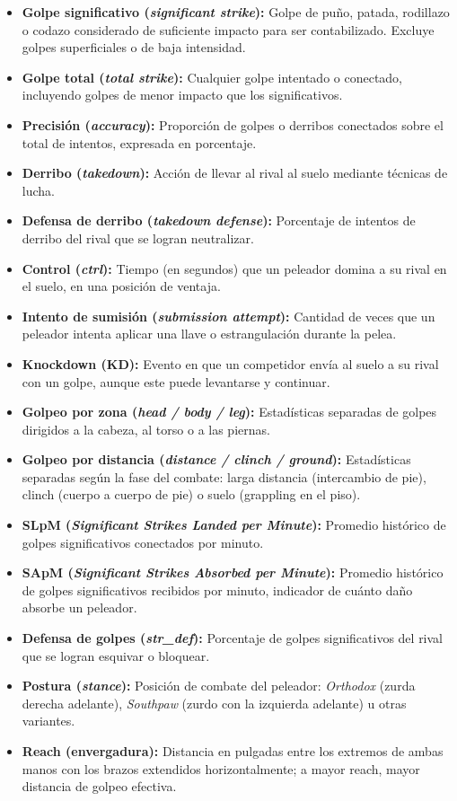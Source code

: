 \documentclass[11pt,a4paper]{article}
\begin{document}
\begin{itemize}[leftmargin=*]
  \item \textbf{Golpe significativo (\textit{significant strike}):} Golpe de puño, patada, rodillazo o codazo considerado de suficiente impacto para ser contabilizado. Excluye golpes superficiales o de baja intensidad.
  \item \textbf{Golpe total (\textit{total strike}):} Cualquier golpe intentado o conectado, incluyendo golpes de menor impacto que los significativos.
  \item \textbf{Precisión (\textit{accuracy}):} Proporción de golpes o derribos conectados sobre el total de intentos, expresada en porcentaje.
  \item \textbf{Derribo (\textit{takedown}):} Acción de llevar al rival al suelo mediante técnicas de lucha.
  \item \textbf{Defensa de derribo (\textit{takedown defense}):} Porcentaje de intentos de derribo del rival que se logran neutralizar.
  \item \textbf{Control (\textit{ctrl}):} Tiempo (en segundos) que un peleador domina a su rival en el suelo, en una posición de ventaja.
  \item \textbf{Intento de sumisión (\textit{submission attempt}):} Cantidad de veces que un peleador intenta aplicar una llave o estrangulación durante la pelea.
  \item \textbf{Knockdown (KD):} Evento en que un competidor envía al suelo a su rival con un golpe, aunque este puede levantarse y continuar.
  \item \textbf{Golpeo por zona (\textit{head / body / leg}):} Estadísticas separadas de golpes dirigidos a la cabeza, al torso o a las piernas.
  \item \textbf{Golpeo por distancia (\textit{distance / clinch / ground}):} Estadísticas separadas según la fase del combate: larga distancia (intercambio de pie), clinch (cuerpo a cuerpo de pie) o suelo (grappling en el piso).
  \item \textbf{SLpM (\textit{Significant Strikes Landed per Minute}):} Promedio histórico de golpes significativos conectados por minuto.
  \item \textbf{SApM (\textit{Significant Strikes Absorbed per Minute}):} Promedio histórico de golpes significativos recibidos por minuto, indicador de cuánto daño absorbe un peleador.
  \item \textbf{Defensa de golpes (\textit{str\_def}):} Porcentaje de golpes significativos del rival que se logran esquivar o bloquear.
  \item \textbf{Postura (\textit{stance}):} Posición de combate del peleador: \textit{Orthodox} (zurda derecha adelante), \textit{Southpaw} (zurdo con la izquierda adelante) u otras variantes.
  \item \textbf{Reach (envergadura):} Distancia en pulgadas entre los extremos de ambas manos con los brazos extendidos horizontalmente; a mayor reach, mayor distancia de golpeo efectiva.
\end{itemize}
\end{document}
